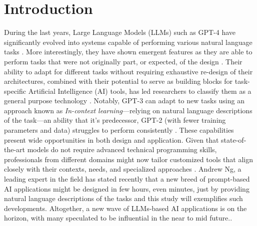 \documentclass[sn-mathphys, Numbered]{sn-jnl}%
\theoremstyle{thmstyleone}%
\theoremstyle{thmstyletwo}%
\theoremstyle{thmstylethree}%
\begin{document}

\maketitle

\section{Introduction}\label{Introduction}
During the last years, Large Language Models (LLMs) such as GPT-4 have significantly evolved into systems capable of performing various natural language tasks \parencite{brown_language_2020}. More interestingly, they have shown emergent features as they are able to perform tasks that were not originally part, or expected, of the design \parencite{wei_emergent_2022}. Their ability to adapt for different tasks without requiring exhaustive re-design of their architectures, combined with their potential to serve as building blocks for task-specific Artificial Intelligence (AI) tools, has led researchers to classify them as a general purpose technology \parencite{eloundou_gpts_2023}. Notably, GPT-3 can adapt to new tasks using an approach known as \textit{In-context learning}---relying on natural language descriptions of the task---an ability that it's predecessor, GPT-2 (with fewer training parameters and data) struggles to perform consistently \parencite{bommasani_opportunities_2022, wei_emergent_2022}. 
These capabilities present wide opportunities in both design and application. Given that state-of-the-art models do not require advanced technical programming skills, professionals from different domains might now tailor customized tools that align closely with their contexts, needs, and specialized approaches \parencite{cain_gpteammate_2023}. Andrew Ng, a leading expert in the field has stated recently that a new breed of prompt-based AI applications might be designed in few hours, even minutes, just by providing natural language descriptions of the tasks \parencite{unknown-author-2023} and this study will exemplifies such developments. Altogether, a new wave of LLMs-based AI applications is on the horizon, with many speculated to be influential in the near to mid future.\parencite{bommasani_opportunities_2022, bubeck_sparks_2023}.
\end{document}
